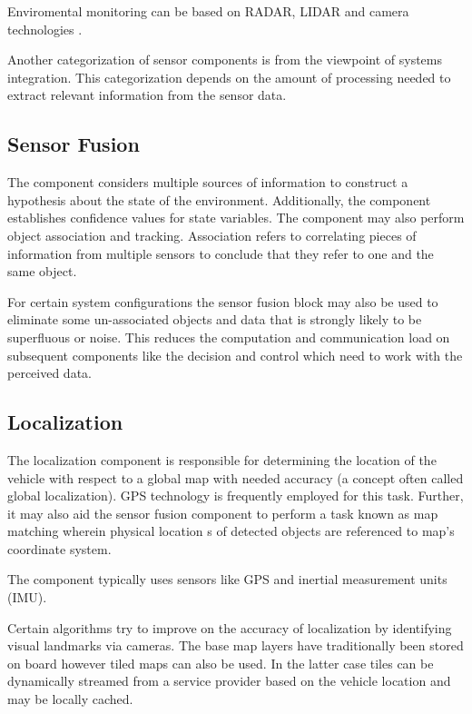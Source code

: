 Enviromental monitoring can be based on RADAR, LIDAR and camera technologies \cite{Serban}. 

Another categorization of sensor components is from the viewpoint of systems integration. 
This categorization depends on the amount of processing needed to extract relevant information from the sensor data.

\subsection{Sensor Fusion}

The component considers multiple sources of information to construct a hypothesis about the state of the environment. 
Additionally, the component establishes confidence values for state variables. 
The component may also perform object association and tracking. Association refers to correlating pieces of
information from multiple sensors to conclude that they refer to one and the same object.

For certain system configurations the sensor fusion block may also be used to eliminate some un-associated objects and data that 
is strongly likely to be superfluous or noise. This reduces the computation and communication load on 
subsequent components like the decision and control which need to work with the perceived data.


\subsection{Localization}

The localization component is responsible for determining the location of the vehicle with respect to a global map with needed accuracy (a concept often called global localization).
GPS technology is frequently employed for this task.
Further, it may also aid the sensor fusion component to perform a task known as map matching wherein physical location s of detected objects are referenced to map’s coordinate system. 

The component typically uses sensors like GPS and inertial measurement units (IMU).

Certain algorithms try to improve on the accuracy of localization by identifying visual landmarks via cameras. The base map layers have traditionally been stored on board however tiled maps can also be used. In the latter case tiles can be dynamically streamed from a service provider based on the vehicle location and may be locally cached.


